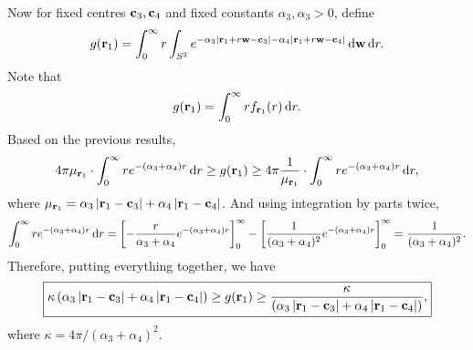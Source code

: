 \documentclass[12pt]{article}
\begin{document}
\newpage

Now for fixed centres \(\mathbf{c}_3, \mathbf{c}_4\) and fixed constants \(\alpha_3, \alpha_3 > 0\), define
\begin{align*}
    g(\mathbf{r}_1) = \int_{0}^{\infty} r \int_{S^2} e^{-\alpha_3|\mathbf{r}_1 + r\mathbf{w} - \mathbf{c}_3|-\alpha_4|\mathbf{r}_1 + r\mathbf{w} - \mathbf{c}_4|} \mathop{}\!\mathrm{d} \mathbf{w} \mathop{}\!\mathrm{d} r.
\end{align*}
Note that
\begin{align*}
    g(\mathbf{r}_1) = \int_{0}^{\infty} r f_{\mathbf{r}_1}(r) \mathop{}\!\mathrm{d} r.
\end{align*}
Based on the previous results,
\begin{align*}
    4\pi \mu_{\mathbf{r}_1} \cdot \int_{0}^{\infty} re^{-(\alpha_3 + \alpha_4)r} \mathop{}\!\mathrm{d} r \geq g(\mathbf{r}_1) \geq 4\pi \frac{1}{\mu_{\mathbf{r}_1}} \cdot \int_{0}^{\infty} re^{-(\alpha_3 + \alpha_4)r} \mathop{}\!\mathrm{d} r,
\end{align*}
where \(\mu_{\mathbf{r}_1} = \alpha_3\left\lvert \mathbf{r}_1 - \mathbf{c}_3 \right\rvert + \alpha_4 \left\lvert \mathbf{r}_1 - \mathbf{c}_4 \right\rvert\).
And using integration by parts twice,
\begin{align*}
    \int_{0}^{\infty} re^{-(\alpha_3 + \alpha_4)r} \mathop{}\!\mathrm{d} r = \left[ -\frac{r}{\alpha_3+\alpha_4}e^{-(\alpha_3 + \alpha_4)r} \right]_0^{\infty} - \left[ \frac{1}{(\alpha_3+\alpha_4)^2}e^{-(\alpha_3+\alpha_4)r} \right]_{0}^{\infty} = \frac{1}{(\alpha_3 + \alpha_4)^2}.
\end{align*}
Therefore, putting everything together, we have
\begin{align*}
    \boxed{\kappa \left( \alpha_3\left\lvert \mathbf{r}_1 - \mathbf{c}_3 \right\rvert + \alpha_4 \left\lvert \mathbf{r}_1 - \mathbf{c}_4 \right\rvert \right) \geq g(\mathbf{r}_1) \geq \frac{\kappa}{\left( \alpha_3\left\lvert \mathbf{r}_1 - \mathbf{c}_3 \right\rvert + \alpha_4 \left\lvert \mathbf{r}_1 - \mathbf{c}_4 \right\rvert \right)},}
\end{align*}
where \(\kappa = 4\pi/(\alpha_3 + \alpha_4)^2\).
\end{document}
